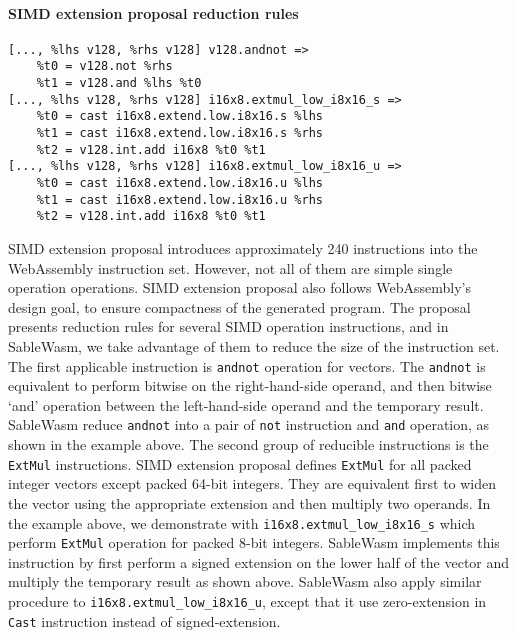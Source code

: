 \paragraph{SIMD extension proposal reduction rules} \quad
\begin{lstlisting}[basicstyle=\linespread{0.8}\small, language=SableWasmMIR]
[..., %lhs v128, %rhs v128] v128.andnot =>
    %t0 = v128.not %rhs 
    %t1 = v128.and %lhs %t0
[..., %lhs v128, %rhs v128] i16x8.extmul_low_i8x16_s =>
    %t0 = cast i16x8.extend.low.i8x16.s %lhs
    %t1 = cast i16x8.extend.low.i8x16.s %rhs
    %t2 = v128.int.add i16x8 %t0 %t1
[..., %lhs v128, %rhs v128] i16x8.extmul_low_i8x16_u =>
    %t0 = cast i16x8.extend.low.i8x16.u %lhs
    %t1 = cast i16x8.extend.low.i8x16.u %rhs
    %t2 = v128.int.add i16x8 %t0 %t1
\end{lstlisting}
SIMD extension proposal introduces approximately 240 instructions into the WebAssembly instruction set. However, not all of them are simple single operation operations. SIMD extension proposal also follows WebAssembly's design goal, to ensure compactness of the generated program. The proposal presents reduction rules for several SIMD operation instructions, and in SableWasm, we take advantage of them to reduce the size of the instruction set. The first applicable instruction is \texttt{andnot} operation for vectors. The \texttt{andnot} is equivalent to perform bitwise on the right-hand-side operand, and then bitwise `and' operation between the left-hand-side operand and the temporary result. SableWasm reduce \texttt{andnot} into a pair of \texttt{not} instruction and \texttt{and} operation, as shown in the example above. The second group of reducible instructions is the \texttt{ExtMul} instructions. SIMD extension proposal defines \texttt{ExtMul} for all packed integer vectors except packed 64-bit integers. They are equivalent first to widen the vector using the appropriate extension and then multiply two operands. In the example above, we demonstrate with \texttt{i16x8.extmul\_low\_i8x16\_s} which perform \texttt{ExtMul} operation for packed 8-bit integers. SableWasm implements this instruction by first perform a signed extension on the lower half of the vector and multiply the temporary result as shown above. SableWasm also apply similar procedure to \texttt{i16x8.extmul\_low\_i8x16\_u}, except that it use zero-extension in \texttt{Cast} instruction instead of signed-extension.

